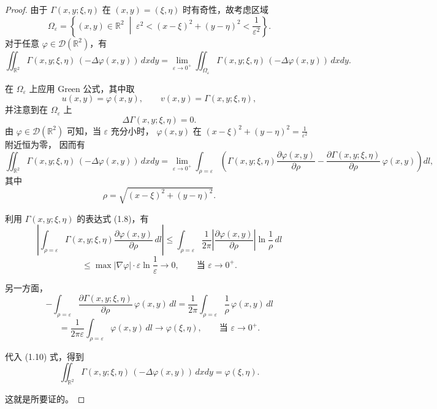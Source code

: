 \documentclass[12pt,a4paper]{ctexart}
\begin{document}
	\begin{proof}
		由于 $\Gamma(x,y;\xi,\eta)$ 在 $(x,y) = (\xi,\eta)$ 时有奇性，故考虑区域
		\[
		\Omega_\varepsilon
		= \left\{ (x,y)\in\mathbb{R}^2
		\;\middle|\;
		\varepsilon^2 < (x-\xi)^2 + (y-\eta)^2 < \frac{1}{\varepsilon^2}
		\right\}.
		\]
		对于任意 $\varphi \in \mathcal{D}(\mathbb{R}^2)$，有
		\[
		\iint_{\mathbb{R}^2} \Gamma(x,y;\xi,\eta)\,(-\Delta\varphi(x,y))\,dxdy
		= \lim_{\varepsilon\to0^+}
		\iint_{\Omega_\varepsilon}
		\Gamma(x,y;\xi,\eta)\,(-\Delta\varphi(x,y))\,dxdy.
		\]
		
		在 $\Omega_\varepsilon$ 上应用 Green 公式，其中取
		\[
		u(x,y) = \varphi(x,y), \qquad
		v(x,y) = \Gamma(x,y;\xi,\eta),
		\]
		并注意到在 $\Omega_\varepsilon$ 上
		\[
		\Delta \Gamma(x,y;\xi,\eta) = 0.
		\]
		由 $\varphi \in \mathcal{D}(\mathbb{R}^2)$ 可知，当 $\varepsilon$ 充分小时，
		$\varphi(x,y)$ 在 $(x-\xi)^2+(y-\eta)^2 = \frac{1}{\varepsilon^2}$ 附近恒为零，
		因而有
		\begin{equation}
			\iint_{\mathbb{R}^2} \Gamma(x,y;\xi,\eta)\,(-\Delta\varphi(x,y))\,dxdy
			=
			\lim_{\varepsilon\to0^+}
			\int_{\rho=\varepsilon}
			\left(
			\Gamma(x,y;\xi,\eta)\frac{\partial\varphi(x,y)}{\partial\rho}
			-
			\frac{\partial\Gamma(x,y;\xi,\eta)}{\partial\rho}\,\varphi(x,y)
			\right) dl,
			\tag{1.10}
		\end{equation}
		其中
		\[
		\rho = \sqrt{(x-\xi)^2 + (y-\eta)^2}.
		\]
		
		利用 $\Gamma(x,y;\xi,\eta)$ 的表达式 (1.8)，有
		\[
		\left|
		\int_{\rho=\varepsilon}
		\Gamma(x,y;\xi,\eta)\frac{\partial\varphi(x,y)}{\partial\rho}\,dl
		\right|
		\le
		\int_{\rho=\varepsilon}
		\frac{1}{2\pi}
		\left|\frac{\partial\varphi(x,y)}{\partial\rho}\right|
		\ln\frac{1}{\rho}\,dl
		\]
		\[
		\le
		\max|\nabla\varphi|\cdot \varepsilon\ln\frac{1}{\varepsilon}
		\longrightarrow 0,
		\qquad \text{当 } \varepsilon\to0^+.
		\]
		
		另一方面，
		\[
		-
		\int_{\rho=\varepsilon}
		\frac{\partial\Gamma(x,y;\xi,\eta)}{\partial\rho}\,
		\varphi(x,y)\,dl
		=
		\frac{1}{2\pi}
		\int_{\rho=\varepsilon}
		\frac{1}{\rho}\,\varphi(x,y)\,dl
		\]
		\[
		=
		\frac{1}{2\pi\varepsilon}
		\int_{\rho=\varepsilon}
		\varphi(x,y)\,dl
		\longrightarrow
		\varphi(\xi,\eta),
		\qquad \text{当 } \varepsilon\to0^+.
		\]
		
		代入 (1.10) 式，得到
		\[
		\iint_{\mathbb{R}^2}
		\Gamma(x,y;\xi,\eta)\,(-\Delta\varphi(x,y))\,dxdy
		=
		\varphi(\xi,\eta).
		\]
		
		这就是所要证的。
	\end{proof}
	
\end{document}
